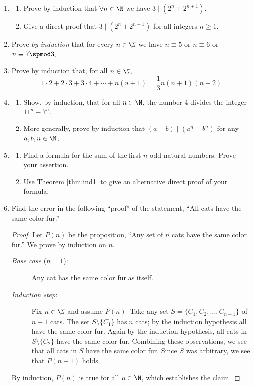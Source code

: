 \begin{exercises}{}{}
\begin{enumerate}
	
  	\item\begin{enumerate}
    	\item Prove by induction that $\forall n\in\N$ we have $3\mid(2^n+2^{n+1})$.
    	\item Give a direct proof that $3\mid(2^n+2^{n+1})$ for all integers $n\ge 1$.
  	\end{enumerate}

  
		\item Prove \emph{by induction} that for every $n\in\N$ we have $n\equiv 5$ or $n\equiv 6$ or $n\equiv 7\spmod 3$.
	
		\item Prove by induction that, for all $n\in\N$,
		\[
			1\cdot 2+2\cdot 3+3\cdot 4+\cdots +n(n+1) =\frac 13n(n+1)(n+2)
		\]

		\item\begin{enumerate}
		  \item Show, by induction, that for all $n\in\N$, the number 4 divides the integer $11^n-7^n$.
			\item More generally, prove by induction that $(a-b)\mid (a^n-b^n)$ for any $a,b,n\in\N$.
		\end{enumerate}
	
	
	
	
		\item\begin{enumerate}
		  \item Find a formula for the sum of the first $n$ odd natural numbers. Prove your assertion.
		 	\item Use Theorem \ref{thm:ind1} to give an alternative direct proof of your formula.
		\end{enumerate} 
  

		\item Find the error in the following ``proof'' of the statement, ``All cats have the same color fur.''
		\begin{proof}
	    Let $P(n)$ be the proposition, ``Any set of $n$ cats have the same color fur.'' We prove by induction on $n$. 
	    \begin{description}
	    	\item[\normalfont\emph{Base case} ($n=1$):] Any cat has the same color fur as itself.
	    	\item[\normalfont\emph{Induction step}:] Fix $n\in\N$ and assume $P(n)$. Take any set $S= \{C_1,C_2,\ldots,C_{n+1}\}$ of $n+1$ cats. The set $S\setminus\{C_1\}$ has $n$ cats; by the induction hypothesis all have the same color fur. Again by the induction hypothesis, all cats in $S\setminus\{C_2\}$ have the same color fur. Combining these observations, we see that all cats in $S$ have the same color fur. Since $S$ was arbitrary, we see that $P(n+1)$ holds.
	    \end{description}
	    By induction, $P(n)$ is true for all $n\in\N$, which establishes the claim.
		\end{proof}


\end{enumerate}
\end{exercises}
